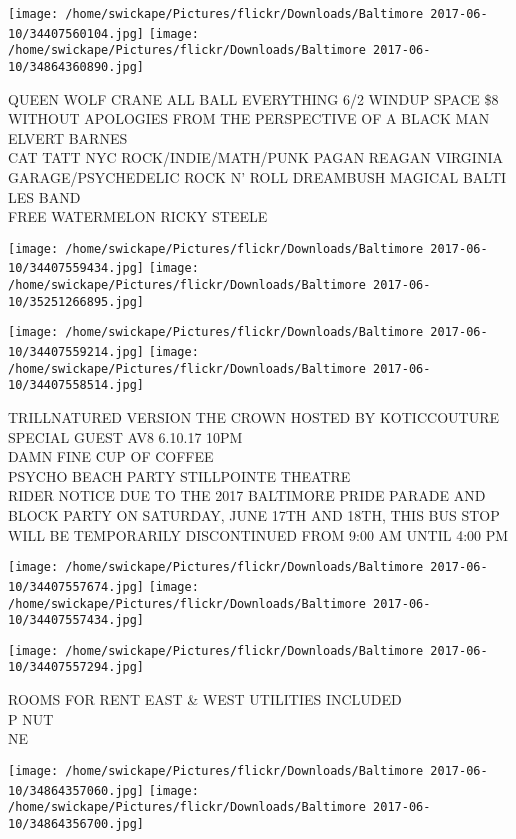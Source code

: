 \documentclass[10pt,letterpaper]{article}
\begin{document}
\texttt{[image: /home/swickape/Pictures/flickr/Downloads/Baltimore 2017-06-10/34407560104.jpg]}
\texttt{[image: /home/swickape/Pictures/flickr/Downloads/Baltimore 2017-06-10/34864360890.jpg]}

QUEEN WOLF CRANE ALL BALL EVERYTHING 6/2 WINDUP SPACE \$8\\
WITHOUT APOLOGIES FROM THE PERSPECTIVE OF A BLACK MAN ELVERT BARNES\\
CAT TATT NYC ROCK/INDIE/MATH/PUNK PAGAN REAGAN VIRGINIA GARAGE/PSYCHEDELIC ROCK N' ROLL DREAMBUSH MAGICAL BALTI LES BAND\\
FREE WATERMELON RICKY STEELE\\
\pagebreak

\texttt{[image: /home/swickape/Pictures/flickr/Downloads/Baltimore 2017-06-10/34407559434.jpg]}
\texttt{[image: /home/swickape/Pictures/flickr/Downloads/Baltimore 2017-06-10/35251266895.jpg]}

\texttt{[image: /home/swickape/Pictures/flickr/Downloads/Baltimore 2017-06-10/34407559214.jpg]}
\texttt{[image: /home/swickape/Pictures/flickr/Downloads/Baltimore 2017-06-10/34407558514.jpg]}

TRILLNATURED VERSION THE CROWN HOSTED BY KOTICCOUTURE SPECIAL GUEST AV8 6.10.17 10PM\\
DAMN FINE CUP OF COFFEE\\
PSYCHO BEACH PARTY STILLPOINTE THEATRE\\
RIDER NOTICE DUE TO THE 2017 BALTIMORE PRIDE PARADE AND BLOCK PARTY ON SATURDAY, JUNE 17TH AND 18TH, THIS BUS STOP WILL BE TEMPORARILY DISCONTINUED FROM 9:00 AM UNTIL 4:00 PM\\
\pagebreak

\texttt{[image: /home/swickape/Pictures/flickr/Downloads/Baltimore 2017-06-10/34407557674.jpg]}
\texttt{[image: /home/swickape/Pictures/flickr/Downloads/Baltimore 2017-06-10/34407557434.jpg]}

\vspace{0.25in}
\texttt{[image: /home/swickape/Pictures/flickr/Downloads/Baltimore 2017-06-10/34407557294.jpg]}

ROOMS FOR RENT EAST \& WEST UTILITIES INCLUDED\\
P NUT\\
NE\\
\pagebreak

\texttt{[image: /home/swickape/Pictures/flickr/Downloads/Baltimore 2017-06-10/34864357060.jpg]}
\texttt{[image: /home/swickape/Pictures/flickr/Downloads/Baltimore 2017-06-10/34864356700.jpg]}
\end{document}
